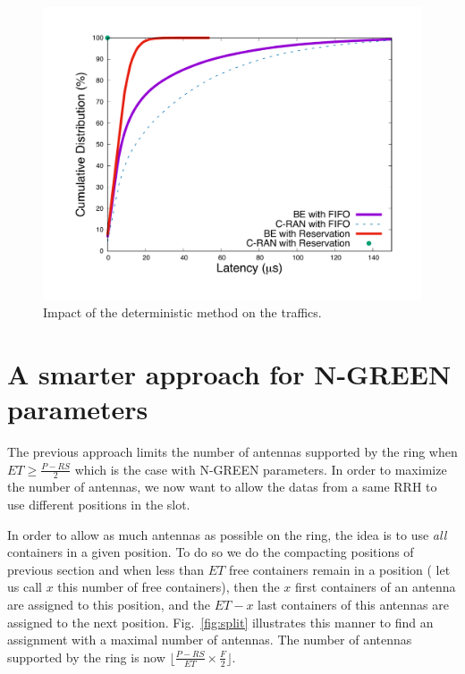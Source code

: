 \documentclass[10pt, conference, letterpaper]{IEEEtran}
\begin{document}
  
  
  \begin{figure}[h!]
\begin{center}   

     \includegraphics[scale=0.25]{optim.pdf}
     \caption{Impact of the deterministic method on the traffics.}   \label{fig:optimres}

\end{center}
  \end{figure}
  
\section{A smarter approach for N-GREEN parameters}
\label{sec:maxant}

The previous approach limits the number of antennas supported by the ring when $ET \geq \frac{P-RS}{2}$ which is the case with N-GREEN parameters. In order to maximize the number of antennas, we now want to allow the datas from a same RRH to use different positions in the slot. 

In order to allow as much antennas as possible on the ring, the idea is to use \emph{all} containers in a given position. To do so we do the compacting positions of previous section and when less than $ET$ free containers remain in a position ( let us call $x$ this number of free containers), then the $x$ first containers of an antenna are assigned to this position, and the $ET - x$ last containers of this antennas are assigned to the next position. Fig.~\ref{fig:split} illustrates this manner to find an assignment with a maximal number of antennas. The number of antennas supported by the ring is now  $\lfloor\frac{P- RS}{ET} \times \frac{F}{2}\rfloor$. 
\end{document}
